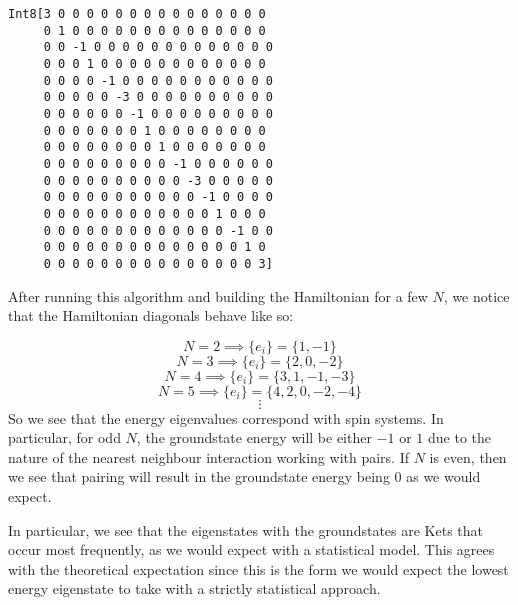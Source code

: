 \documentclass[11pt]{article}
\begin{document}
    \begin{Verbatim}[commandchars=\\\{\}]
Int8[3 0 0 0 0 0 0 0 0 0 0 0 0 0 0 0
     0 1 0 0 0 0 0 0 0 0 0 0 0 0 0 0
     0 0 -1 0 0 0 0 0 0 0 0 0 0 0 0 0
     0 0 0 1 0 0 0 0 0 0 0 0 0 0 0 0
     0 0 0 0 -1 0 0 0 0 0 0 0 0 0 0 0
     0 0 0 0 0 -3 0 0 0 0 0 0 0 0 0 0
     0 0 0 0 0 0 -1 0 0 0 0 0 0 0 0 0
     0 0 0 0 0 0 0 1 0 0 0 0 0 0 0 0
     0 0 0 0 0 0 0 0 1 0 0 0 0 0 0 0
     0 0 0 0 0 0 0 0 0 -1 0 0 0 0 0 0
     0 0 0 0 0 0 0 0 0 0 -3 0 0 0 0 0
     0 0 0 0 0 0 0 0 0 0 0 -1 0 0 0 0
     0 0 0 0 0 0 0 0 0 0 0 0 1 0 0 0
     0 0 0 0 0 0 0 0 0 0 0 0 0 -1 0 0
     0 0 0 0 0 0 0 0 0 0 0 0 0 0 1 0
     0 0 0 0 0 0 0 0 0 0 0 0 0 0 0 3]
    \end{Verbatim}
    \newpage
    
    After running this algorithm and building the Hamiltonian for a few $N$, we notice that the Hamiltonian diagonals behave like so:

    $$N = 2 \implies \{e_{i}\} = \{1,-1\}$$
    $$N = 3 \implies \{e_{i}\} = \{2,0,-2\}$$
    $$N = 4 \implies \{e_{i}\} = \{3,1,-1,-3\}$$
    $$N = 5 \implies \{e_{i}\} = \{4,2,0,-2,-4\} $$
    $$ \vdots $$
    So we see that the energy eigenvalues correspond with spin systems. In particular, for odd $N$, the groundstate energy will be either $-1$ or $1$ due to the nature of the nearest neighbour interaction working with pairs. If $N$ is even, then we see that pairing will result in the groundstate energy being $0$ as we would expect.

   In particular, we see that the eigenstates with the groundstates are Kets that occur most frequently, as we would expect with a statistical model. This agrees with the theoretical expectation since this is the form we would expect the lowest energy eigenstate to take with a strictly statistical approach.
    
    
\end{document}
